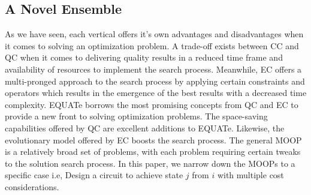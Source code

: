 \documentclass[conference]{IEEEtran}
\begin{document}
\subsection{A Novel Ensemble}
As we have seen, each vertical offers it's own advantages and disadvantages when it comes to solving an optimization problem. A trade-off exists between CC and QC when it comes to delivering quality results in a reduced time frame and availability of resources to implement the search process. Meanwhile, EC offers a multi-pronged approach to the search process by applying certain constraints and operators which results in the emergence of the best results with a decreased time complexity. EQUATe borrows the most promising concepts from QC and EC to provide a new front to solving optimization problems. The space-saving capabilities offered by QC are excellent additions to EQUATe. Likewise, the evolutionary model offered by EC boosts the search process. The general MOOP is a relatively broad set of problems, with each problem requiring certain tweaks to the solution search process. In this paper, we narrow down the MOOPs to a specific case i.e, Design a circuit to achieve state $j$ from $i$ with multiple cost considerations. 
% 
% 
\end{document}
